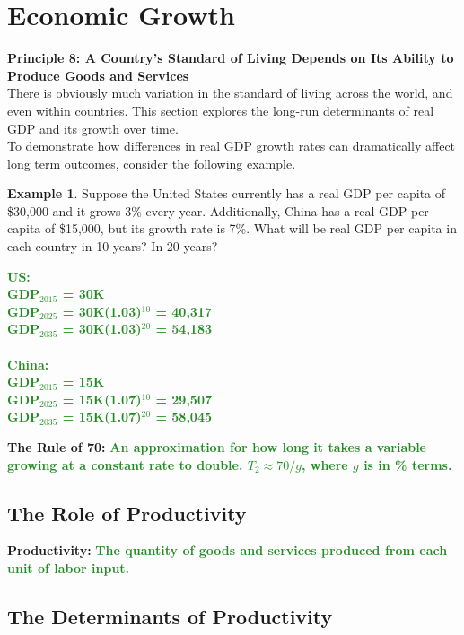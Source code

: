 \documentclass[11pt]{article}\usepackage[]{graphicx}\usepackage[]{color}
\theoremstyle{definition}
\newtheorem{exmp}{Example}[section]
\newcommand{\blank}[1]{}
\newcommand{\ddp}[1]{{\textbf{\textcolor{ForestGreen}{#1}}}}
\newcommand{\defn}[1]{\textbf{#1}}
\begin{document}
\section{Economic Growth}

\textbf{Principle 8: A Country's Standard of Living Depends on Its Ability to Produce Goods and Services}
\\

There is obviously much variation in the standard of living across the world, and even within countries. This section explores the long-run determinants of real GDP and its growth over time.
\\

To demonstrate how differences in real GDP growth rates can dramatically affect long term outcomes, consider the following example.
\\

\begin{exmp} 
	
Suppose the United States currently has a real GDP per capita of \$30,000 and it grows 3\% every year. Additionally, China has a real GDP per capita of \$15,000, but its growth rate is 7\%. What will be real GDP per capita in each country in 10 years? In 20 years?
\end{exmp}
\ddp{US: \\
	GDP$_{2015}$ = 30K\\
	 GDP$_{2025}$ = 30K(1.03)$^{10}$ = 40,317\\
	 GDP$_{2035}$ = 30K(1.03)$^{20}$ = 54,183\\ \\
	China: \\ 
	GDP$_{2015}$ = 15K\\
	GDP$_{2025}$ = 15K(1.07)$^{10}$ = 29,507\\
	GDP$_{2035}$ = 15K(1.07)$^{20}$ = 58,045\\}
\blank{}
\blank{}


\defn{The Rule of 70:} \ddp{An approximation for how long it takes a variable growing at a constant rate to double. $T_2 \approx 70/g$, where $g$ is in \% terms.}

\subsection{The Role of Productivity}

\defn{Productivity:} \ddp{The quantity of goods and services produced from each unit of labor input.}


\subsection*{The Determinants of Productivity}
\end{document}

